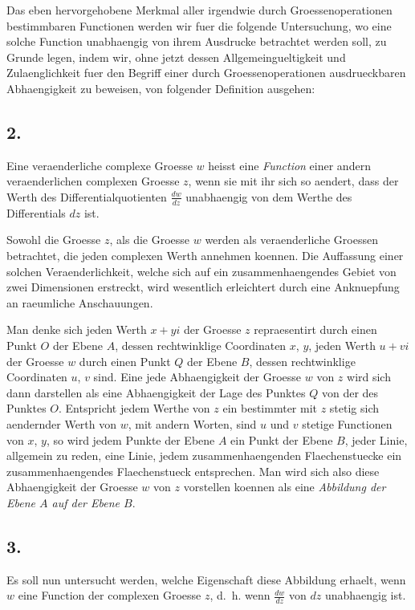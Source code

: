 \documentclass[11pt,a4paper]{article}
\theoremstyle{plain}
\theoremstyle{definition}
\begin{document}
Das eben hervorgehobene Merkmal aller irgendwie durch Groessenoperationen bestimmbaren Functionen werden wir fuer die folgende Untersuchung, wo eine solche Function unabhaengig von ihrem Ausdrucke betrachtet werden soll, zu Grunde legen, indem wir, ohne jetzt dessen Allgemeingueltigkeit und Zulaenglichkeit fuer den Begriff einer durch Groessenoperationen ausdrueckbaren Abhaengigkeit zu beweisen, von folgender Definition ausgehen:

\subsection*{2.}

Eine veraenderliche complexe Groesse $w$ heisst eine \emph{Function} einer andern veraenderlichen complexen Groesse $z$, wenn sie mit ihr sich so aendert, dass der Werth des Differentialquotienten $\frac{dw}{dz}$ unabhaengig von dem Werthe des Differentials $dz$ ist.

Sowohl die Groesse $z$, als die Groesse $w$ werden als veraenderliche Groessen betrachtet, die jeden complexen Werth annehmen koennen. Die Auffassung einer solchen Veraenderlichkeit, welche sich auf ein zusammenhaengendes Gebiet von zwei Dimensionen erstreckt, wird wesentlich erleichtert durch eine Anknuepfung an raeumliche Anschauungen.

Man denke sich jeden Werth $x + yi$ der Groesse $z$ repraesentirt durch einen Punkt $O$ der Ebene $A$, dessen rechtwinklige Coordinaten $x$, $y$, jeden Werth $u + vi$ der Groesse $w$ durch einen Punkt $Q$ der Ebene $B$, dessen rechtwinklige Coordinaten $u$, $v$ sind. Eine jede Abhaengigkeit der Groesse $w$ von $z$ wird sich dann darstellen als eine Abhaengigkeit der Lage des Punktes $Q$ von der des Punktes $O$. Entspricht jedem Werthe von $z$ ein bestimmter mit $z$ stetig sich aendernder Werth von $w$, mit andern Worten, sind $u$ und $v$ stetige Functionen von $x$, $y$, so wird jedem Punkte der Ebene $A$ ein Punkt der Ebene $B$, jeder Linie, allgemein zu reden, eine Linie, jedem zusammenhaengenden Flaechenstuecke ein zusammenhaengendes Flaechenstueck entsprechen. Man wird sich also diese Abhaengigkeit der Groesse $w$ von $z$ vorstellen koennen als eine \emph{Abbildung der Ebene $A$ auf der Ebene $B$}.

\subsection*{3.}

Es soll nun untersucht werden, welche Eigenschaft diese Abbildung erhaelt, wenn $w$ eine Function der complexen Groesse $z$, d.\ h. wenn $\frac{dw}{dz}$ von $dz$ unabhaengig ist.
\end{document}
